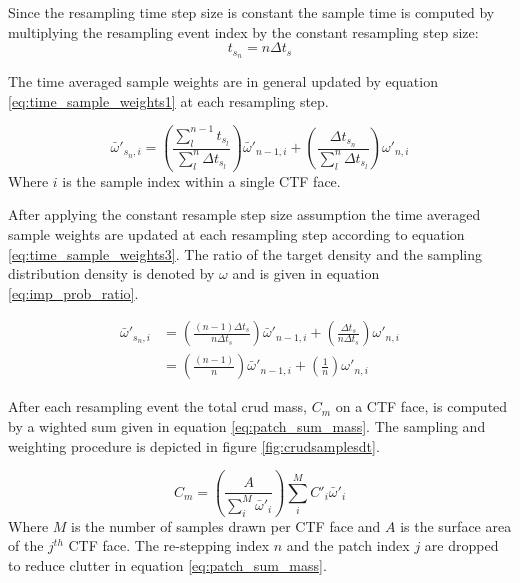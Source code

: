 Since the resampling time step size is constant the sample time is computed by multiplying the resampling event index by the constant resampling step size:
\begin{equation}
t_{s_n} = n\Delta t_s
\end{equation}

The time averaged sample weights are in general updated by equation \ref{eq:time_sample_weights1} at each resampling step.

\begin{equation}
\bar \omega'_{{s_n},i} = 
\left( \frac{\sum_{l}^{n-1}t_{s_l}}{\sum_l^n \Delta t_{s_l}} \right) \bar \omega'_{n-1,i} + 
\left( \frac{\Delta t_{s_n}}{\sum_l^n \Delta t_{s_l}} \right) \omega'_{n,i}
\label{eq:time_sample_weights1}
\end{equation}
Where $i$ is the sample index within a single CTF face.

After applying the constant resample step size assumption the time averaged sample weights are updated at each resampling step according to equation \ref{eq:time_sample_weights3}.
The ratio of the target density and the sampling distribution density is denoted by $\omega$ and is given in equation \ref{eq:imp_prob_ratio}. 

\begin{align}
\bar \omega'_{{s_n},i} &= \left( \frac{(n-1) \Delta t_s}{n \Delta t_s} \right) \bar \omega'_{n-1,i} + \left( \frac{\Delta t_s}{n \Delta t_s} \right) \omega'_{n,i} \nonumber \\
 &= \left( \frac{(n-1)}{n} \right) \bar \omega'_{n-1,i} + \left( \frac{1}{n} \right) \omega'_{n,i}
\label{eq:time_sample_weights3}
\end{align}

After each resampling event the total crud mass, $C_m$ on a CTF face, is computed by a wighted sum given in equation \ref{eq:patch_sum_mass}.  The sampling and weighting procedure is depicted in figure \ref{fig:crudsamplesdt}.

\begin{equation}
C_{m} = \left(\frac{A}{\sum_i^M \bar \omega'_i}\right) \sum_i^M C'_i \bar \omega'_i
\label{eq:patch_sum_mass}
\end{equation}
Where $M$ is the number of samples drawn per CTF face and $A$ is the surface area of the $j^{th}$ CTF face.  The re-stepping index $n$ and the patch index $j$ are dropped to reduce clutter in equation \ref{eq:patch_sum_mass}.

